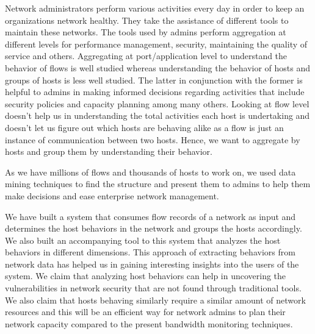 
Network administrators perform various activities every day in order to keep an organizations network healthy. They take the assistance of different tools to maintain these networks. The tools used by admins perform aggregation at different levels for performance management, security, maintaining the quality of service and others. Aggregating at port/application level to understand the behavior of flows is well studied whereas understanding the behavior of hosts and groups of hosts is less well studied. The latter in conjunction with the former is helpful to admins in making
informed decisions regarding activities that include security policies and capacity planning among
many others. Looking at flow level doesn't help us in understanding the total activities each host is
undertaking and doesn't let us figure out which hosts are behaving alike as a flow is just an instance of
communication between two hosts. Hence, we want to aggregate by hosts and group them by
understanding their behavior.

As we have millions of flows and thousands of hosts to work on, we used data mining techniques to find the structure and present them to admins to help them
make decisions and ease enterprise network management.

We have built a system that consumes flow records of a network as input and determines the host behaviors in the network and groups the hosts accordingly. We also built an accompanying tool to this system that analyzes the host behaviors in different dimensions. This approach of extracting behaviors from network data has helped us in gaining interesting insights into the users of the system. We claim that analyzing host behaviors can help in uncovering the vulnerabilities in network security that are not found through traditional tools. We also claim that hosts behaving similarly require a similar amount of network resources and this will be an efficient way for network admins to plan their network capacity compared to the present bandwidth monitoring techniques.   